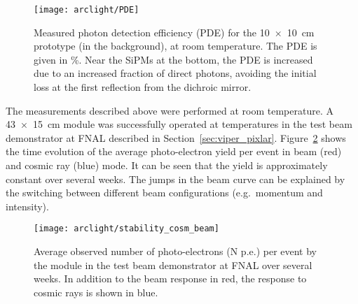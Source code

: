 \begin{figure}[htb]
	\centering
	\texttt{[image: arclight/PDE]}
	\caption{Measured photon detection efficiency (PDE) for the \SI{10 x 10}{\centi\metre} \AL{} prototype (in the background), at room temperature.
		The PDE is given in \si{\percent}.
		Near the SiPMs at the bottom, the PDE is increased due to an increased fraction of direct photons, avoiding the initial loss at the first reflection from the dichroic mirror.}
	\label{fig:arclight_pde}
\end{figure}

The measurements described above were performed at room temperature.
A \SI{43 x 15}{\centi\metre} \AL{} module was successfully operated at \lar{} temperatures in the \pixlar{} test beam demonstrator at FNAL described in Section~\ref{sec:viper_pixlar}.
Figure~\ref{fig:arclight_pixlar} shows the time evolution of the average photo-electron yield per event in beam (red) and cosmic ray (blue) mode.
It can be seen that the yield is approximately constant over several weeks.
The jumps in the beam curve can be explained by the switching between different beam configurations (e.g.\ momentum and intensity).


\begin{figure}[htb]
	\centering
	\texttt{[image: arclight/stability\_cosm\_beam]}
	\caption{Average observed number of photo-electrons (N p.e.) per event by the \AL{} module in the \pixlar{} test beam demonstrator at FNAL over several weeks.
		In addition to the beam response in red, the response to cosmic rays is shown in blue.}
	\label{fig:arclight_pixlar}
\end{figure}


\todo[inline, color=red]{\AL{}}
